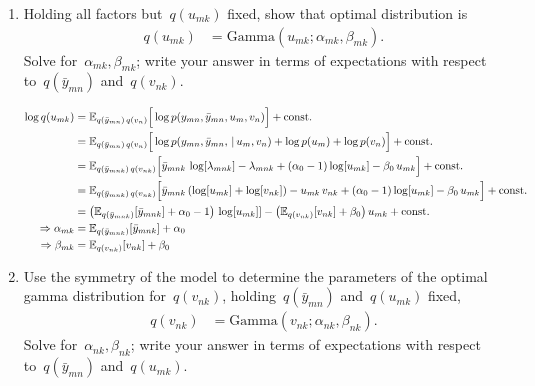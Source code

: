 \begin{enumerate}[label=(\alph*)]
\item Holding all factors but~$q(u_{mk})$ fixed, show that optimal distribution is
\begin{align*}
    q(u_{mk}) 
    &= \mathrm{Gamma}(u_{mk}; \alpha_{mk}, \beta_{mk}).
\end{align*}
Solve for~$\alpha_{mk}, \beta_{mk}$; write your answer in terms of expectations with respect to~$q(\bar{y}_{mn})$ and~$q(v_{nk})$.

\begin{solution}
\begin{align*}
    \log q(u_{mk})
        &= \mathbb{E}_{q(\bar{y}_{mn})\,q(v_n)} \Big[
            \log p(y_{mn}, \bar{y}_{mn}, u_m, v_n)
            \Big] + \textrm{const.}\\
        &= \mathbb{E}_{q(\bar{y}_{mn})\,q(v_n)} \Big[
            \log p(y_{mn}, \bar{y}_{mn}, \,|\, u_m, v_n)
            + \log p(u_m) + \log p(v_n)
            \Big] + \textrm{const.}\\
        &= \mathbb{E}_{q(\bar{y}_{mnk})\,q(v_{nk})} \Big[
            \bar{y}_{mnk}\,\log[\lambda_{mnk}] - \lambda_{mnk}
            +(\alpha_0-1) \log[u_{mk}] - \beta_0\,u_{mk}
            \Big] + \textrm{const.}\\
        &= \mathbb{E}_{q(\bar{y}_{mnk})\,q(v_{nk})} \Big[
            \bar{y}_{mnk}\,(\log[u_{mk}]+\log[v_{nk}]) - u_{mk}\,v_{nk}
            +(\alpha_0-1) \log[u_{mk}] - \beta_0\,u_{mk}
            \Big] + \textrm{const.} \\
        &= \big(\mathbb{E}_{q(\bar{y}_{mnk})}[\bar{y}_{mnk}]
                        +\alpha_0-1\big)\, \log[u_{mk}]]
            - \big(\mathbb{E}_{q(v_{nk})}[v_{nk}] + \beta_0\big)\,u_{mk}
            + \textrm{const.} \\
    \Rightarrow \alpha_{mk}
        &= \mathbb{E}_{q(\bar{y}_{mnk})}[\bar{y}_{mnk}] + \alpha_0 \\
    \Rightarrow \beta_{mk}
        &= \mathbb{E}_{q(v_{nk})}[v_{nk}] + \beta_0
\end{align*}
\end{solution}

\item Use the symmetry of the model to determine the parameters of the optimal gamma distribution for~$q(v_{nk})$, holding~$q(\bar{y}_{mn})$ and~$q(u_{mk})$ fixed,
\begin{align*}
    q(v_{nk}) &= \mathrm{Gamma}(v_{nk}; \alpha_{nk}, \beta_{nk}).
\end{align*}
Solve for~$\alpha_{nk}, \beta_{nk}$; write your answer in terms of expectations with respect to~$q(\bar{y}_{mn})$ and~$q(u_{mk})$.


\end{enumerate}
